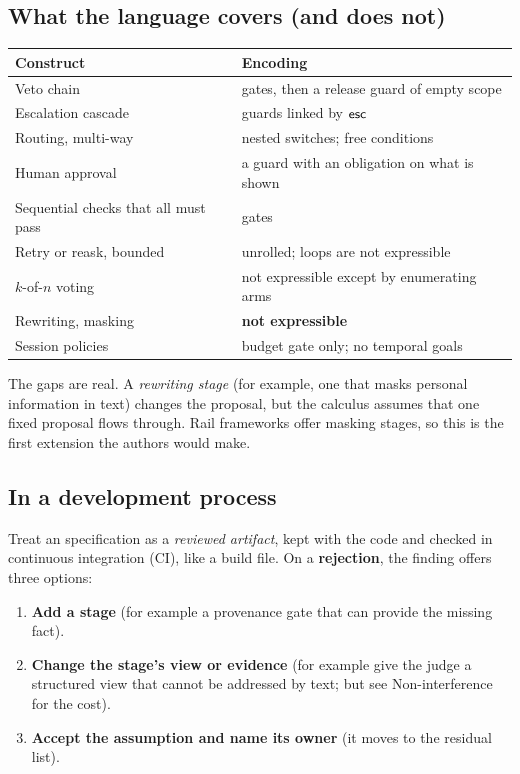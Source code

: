\subsection{What the language covers (and does not)}

\begin{center}
\renewcommand{\arraystretch}{1.2}
\small
\begin{tabularx}{\textwidth}{@{}p{4.5cm}X@{}}
\toprule
\textbf{Construct} & \textbf{Encoding}\\
\midrule
Veto chain & gates, then a release guard of empty scope\\
Escalation cascade & guards linked by $\mathsf{esc}$\\
Routing, multi-way & nested switches; free conditions\\
Human approval & a guard with an obligation on what is shown\\
Sequential checks that all must pass & gates\\
Retry or reask, bounded & unrolled; loops are not expressible\\
$k$-of-$n$ voting & not expressible except by enumerating arms\\
Rewriting, masking & \textbf{not expressible}\\
Session policies & budget gate only; no temporal goals\\
\bottomrule
\end{tabularx}
\end{center}

The gaps are real. A \emph{rewriting stage} (for example, one that masks personal information in text) changes the proposal, but the calculus assumes that one fixed proposal flows through. Rail frameworks offer masking stages, so this is the first extension the authors would make.

\subsection{In a development process}

Treat an \Hsl{} specification as a \emph{reviewed artifact}, kept with the code and checked in continuous integration (CI), like a build file. On a \textbf{rejection}, the finding offers three options:

\begin{enumerate}
\item \textbf{Add a stage} (for example a provenance gate that can provide the missing fact).
\item \textbf{Change the stage's view or evidence} (for example give the judge a structured view that cannot be addressed by text; but see Non-interference for the cost).
\item \textbf{Accept the assumption and name its owner} (it moves to the residual list).
\end{enumerate}

